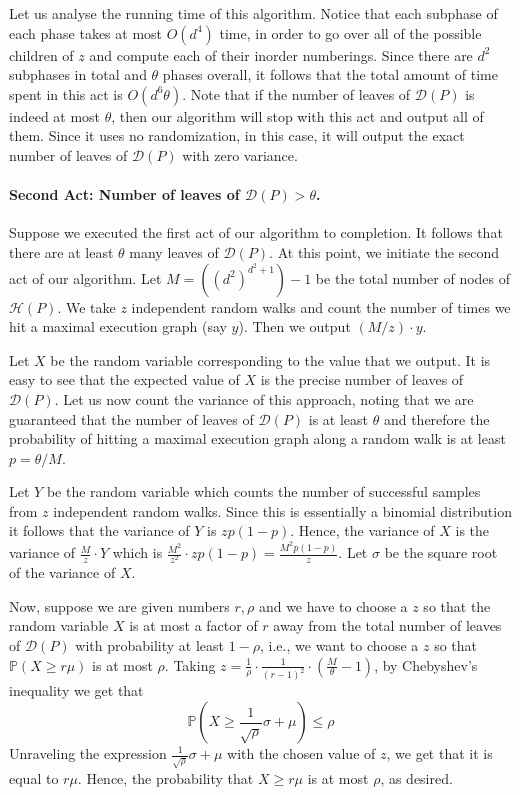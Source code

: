 \documentclass[acmsmall]{acmart}
\begin{document}
Let us analyse the running time of this algorithm. Notice that each subphase of each phase
takes at most $O(d^4)$ time, in order to go over all of the possible children of $z$ and compute each of their inorder numberings. Since there are $d^2$ subphases in total and $\theta$ phases overall, it follows that the total amount of time spent in this act is $O(d^6 \theta)$. Note that if the number of leaves of $\mathcal{D}(P)$ is indeed
at most $\theta$, then our algorithm will stop with this act and output all of them.
Since it uses no randomization, in this case, it will output the exact number of leaves
of $\mathcal{D}(P)$ with zero variance.

\paragraph{Second Act: Number of leaves of $\mathcal{D}(P) > \theta$. }

Suppose we executed the first act of our algorithm to completion. It follows that there
are at least $\theta$ many leaves of $\mathcal{D}(P)$. At this point, we initiate the second act of our algorithm. Let $M = ((d^2)^{d^2+1})-1$ be the total number of nodes
of $\mathcal{H}(P)$. We take $z$ independent random walks and count the number of times we hit a maximal execution graph (say $y$). Then we output $(M/z) \cdot y$. 

Let $X$ be the random variable corresponding to the value that we output.
It is easy to see that the expected value of $X$ is the precise number
of leaves of $\mathcal{D}(P)$. Let us now count the variance of this approach, noting that
we are guaranteed that the number of leaves of $\mathcal{D}(P)$ is at least $\theta$
and therefore the probability of hitting a maximal execution graph along a random walk
is at least $p = \theta/M$. 

Let $Y$ be the random variable which counts the number of successful samples from $z$ independent random walks. Since this is essentially a binomial distribution it follows that
the variance of $Y$ is $zp(1-p)$. Hence, the variance of $X$ is the variance of
$\frac{M}{z} \cdot Y$ which is $\frac{M^2}{z^2} \cdot z p (1-p) = \frac{M^2 p (1-p)}{z}$. 
Let $\sigma$ be the square root of the variance of $X$. 

Now, suppose we are given numbers $r, \rho$ and we have to choose a $z$ so that the random variable $X$ is at most a factor of $r$ away from the total number of leaves of $\mathcal{D}(P)$ with probability at least $1-\rho$, i.e., we want to choose a $z$ so that $\mathbb{P}(X \ge r \mu )$ is at most $\rho$. Taking $z = \frac{1}{\rho} \cdot \frac{1}{(r-1)^2} \cdot \left(\frac{M}{\theta} - 1 \right)$, by Chebyshev's inequality we get that $$\mathbb{P}(X \ge \frac{1}{\sqrt{\rho}} \sigma + \mu ) \le \rho$$ 
Unraveling the expression $\frac{1}{\sqrt{\rho}} \sigma + \mu$ with the chosen value of $z$,
we get that it is equal to $r \mu$. Hence, the probability that $X \ge r \mu$ is at most $\rho$, as desired.
\end{document}
